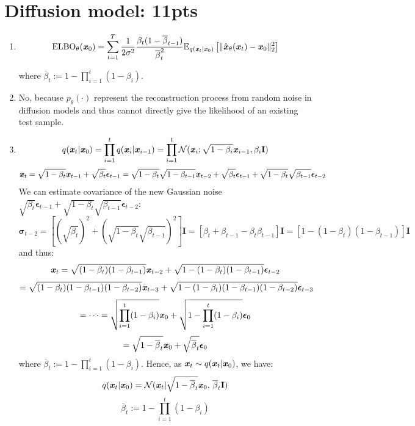 \documentclass[12pt]{article}
\begin{document}
\section{Diffusion model: 11pts}
\begin{enumerate}
    \item \[\text{ELBO}_{\theta}(\textbf{\textit{x}}_0) = \sum_{t=1}^{T}\frac{1}{2\sigma^2}\frac{\beta_{t}(1-\overline{\beta}_{t-1})}{\overline{\beta}_{t}^{2}}\mathbb{E}_{q(\textbf{\textit{x}}_t|\textbf{\textit{x}}_0)}\left[\|\hat{\textbf{\textit{x}}}_{\theta}(\textbf{\textit{x}}_t)-\textbf{\textit{x}}_0\|_2^2\right]\]
    
    where $\overline{\beta}_t := 1 - \prod_{i=1}^{t}(1-\beta_i)$.
    \item No, because $p_{\theta}(\cdot)$ represent the reconstruction process from random noise in diffusion models and thus cannot directly give the likelihood of an existing test sample.
    
    \item \[q(\textbf{\textit{x}}_t|\textbf{\textit{x}}_0) = \prod_{i=1}^{t}q(\textbf{\textit{x}}_i|\textbf{\textit{x}}_{i-1}) = \prod_{i=1}^{t}\mathcal{N}(\textbf{\textit{x}}_i;\sqrt{1-\beta_i}\textbf{\textit{x}}_{i-1},\beta_i\textbf{I})\]
    \[\textbf{\textit{x}}_t = \sqrt{1 - \beta_t}\textbf{\textit{x}}_{t-1} + \sqrt{\beta_t}\bm{\epsilon}_{t-1} = \sqrt{1 - \beta_t}\sqrt{1 - \beta_{t-1}}\textbf{\textit{x}}_{t-2} + \sqrt{\beta_t}\bm{\epsilon}_{t-1} + \sqrt{1 - \beta_t}\sqrt{\beta_{t-1}}\bm{\epsilon}_{t-2}\]
    We can estimate covariance of the new Gaussian noise $\sqrt{\beta_t}\bm{\epsilon}_{t-1} + \sqrt{1 - \beta_t}\sqrt{\beta_{t-1}}\bm{\epsilon}_{t-2}$:
    \[\bm{\sigma}_{t-2} = [(\sqrt{\beta_t})^2 + (\sqrt{1 - \beta_t}\sqrt{\beta_{t-1}})^2]\mathbf{I} = [\beta_t + \beta_{t-1} - \beta_t\beta_{t-1}]\mathbf{I} = [1-(1-\beta_t)(1-\beta_{t-1})]\mathbf{I}\]
    and thus:
    \[\textbf{\textit{x}}_t = \sqrt{(1-\beta_t)(1-\beta_{t-1})}\textbf{\textit{x}}_{t-2} + \sqrt{1 - (1-\beta_t)(1-\beta_{t-1})}\bm{\epsilon}_{t-2}\]
    \[= \sqrt{(1-\beta_t)(1-\beta_{t-1})(1-\beta_{t-2})}\textbf{\textit{x}}_{t-3} + \sqrt{1 - (1-\beta_t)(1-\beta_{t-1})(1-\beta_{t-2})}\bm{\epsilon}_{t-3}\]
    \[=\dots=\sqrt{\prod_{i=1}^{t}(1-\beta_i)}\textbf{\textit{x}}_0 + \sqrt{1-\prod_{i=1}^{t}(1-\beta_i)}\bm{\epsilon}_0\]
    \[= \sqrt{1-\overline{\beta}_t}\textbf{\textit{x}}_0 + \sqrt{\overline{\beta}_t}\bm{\epsilon}_0\]
    where $\overline{\beta}_t := 1 - \prod_{i=1}^{t}(1-\beta_i)$. Hence, as $\textbf{\textit{x}}_t\sim q(\textbf{\textit{x}}_t|\textbf{\textit{x}}_0)$, we have:
    \[q(\textbf{\textit{x}}_t|\textbf{\textit{x}}_0) = \mathcal{N}(\textbf{\textit{x}}_t | \sqrt{1-\overline{\beta}_t}\textbf{\textit{x}}_0,\,\overline{\beta}_t\mathbf{I})\]
    \[\overline{\beta}_t := 1 - \prod_{i=1}^{t}(1-\beta_i)\]
    \newpage


\end{enumerate}
\end{document}
